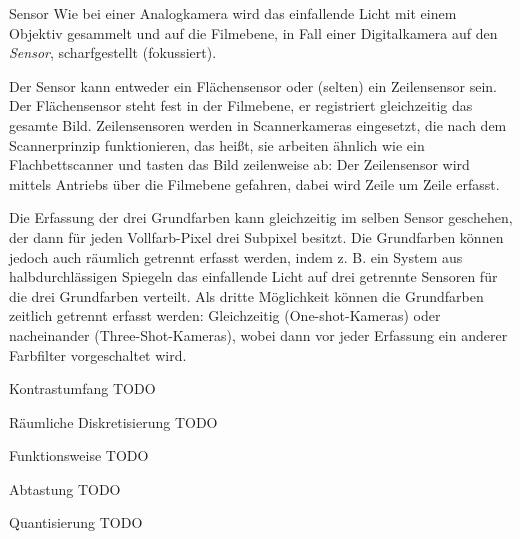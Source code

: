 \begin{defi}[Kamera]{Sensor}
    Wie bei einer Analogkamera wird das einfallende Licht mit einem Objektiv gesammelt und auf die Filmebene, in Fall einer Digitalkamera auf den \emph{Sensor}, scharfgestellt (fokussiert).

    Der Sensor kann entweder ein Flächensensor oder (selten) ein Zeilensensor sein. Der Flächensensor steht fest in der Filmebene, er registriert gleichzeitig das gesamte Bild. Zeilensensoren werden in Scannerkameras eingesetzt, die nach dem Scannerprinzip funktionieren, das heißt, sie arbeiten ähnlich wie ein Flachbettscanner und tasten das Bild zeilenweise ab: Der Zeilensensor wird mittels Antriebs über die Filmebene gefahren, dabei wird Zeile um Zeile erfasst.

    Die Erfassung der drei Grundfarben kann gleichzeitig im selben Sensor geschehen, der dann für jeden Vollfarb-Pixel drei Subpixel besitzt.
    Die Grundfarben können jedoch auch räumlich getrennt erfasst werden, indem z. B. ein System aus halbdurchlässigen Spiegeln das einfallende Licht auf drei getrennte Sensoren für die drei Grundfarben verteilt.
    Als dritte Möglichkeit können die Grundfarben zeitlich getrennt erfasst werden:
    Gleichzeitig (One-shot-Kameras) oder nacheinander (Three-Shot-Kameras), wobei dann vor jeder Erfassung ein anderer Farbfilter vorgeschaltet wird.
\end{defi}

\begin{defi}{Kontrastumfang}
    TODO
\end{defi}

\begin{bonus}{Räumliche Diskretisierung}
    TODO
\end{bonus}

\begin{bonus}{Funktionsweise}
    TODO
\end{bonus}

\begin{defi}{Abtastung}
    TODO
\end{defi}

\begin{defi}{Quantisierung}
    TODO
\end{defi}